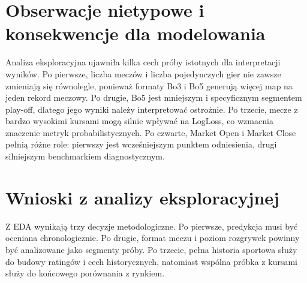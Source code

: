 \section{Obserwacje nietypowe i konsekwencje dla modelowania}

Analiza eksploracyjna ujawniła kilka cech próby istotnych dla interpretacji wyników. Po pierwsze,
liczba meczów i liczba pojedynczych gier nie zawsze zmieniają się równolegle, ponieważ formaty Bo3 i
Bo5 generują więcej map na jeden rekord meczowy. Po drugie, Bo5 jest mniejszym i specyficznym
segmentem play-off, dlatego jego wyniki należy interpretować ostrożnie. Po trzecie, mecze z bardzo
wysokimi kursami mogą silnie wpływać na LogLoss, co wzmacnia znaczenie metryk probabilistycznych. Po
czwarte, Market Open i Market Close pełnią różne role: pierwszy jest wcześniejszym punktem
odniesienia, drugi silniejszym benchmarkiem diagnostycznym.

\section{Wnioski z analizy eksploracyjnej}

Z EDA wynikają trzy decyzje metodologiczne. Po pierwsze, predykcja musi być oceniana
chronologicznie. Po drugie, format meczu i poziom rozgrywek powinny być analizowane jako segmenty
próby. Po trzecie, pełna historia sportowa służy do budowy ratingów i cech historycznych, natomiast
wspólna próbka z kursami służy do końcowego porównania z rynkiem.
